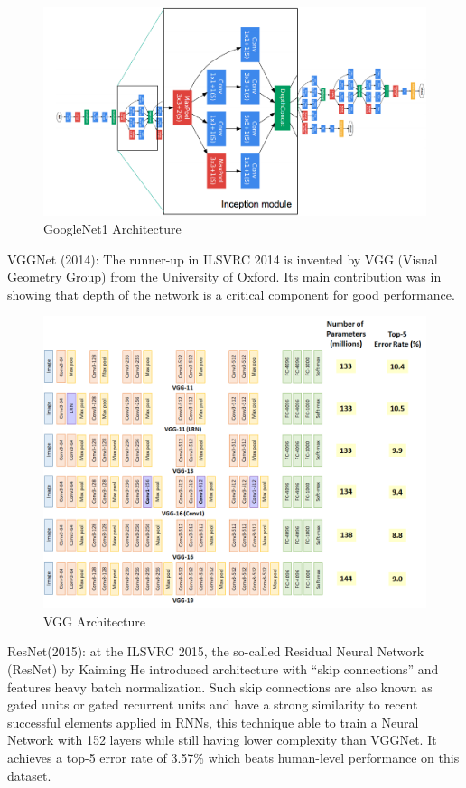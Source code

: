\begin{center}
  \begin{figure}[H]
  \centering
  \includegraphics[width=1\columnwidth]{images/chap2/GoogleNet1.png}
  \caption{GoogleNet1 Architecture}
  \label{chap2:WSP}
  \end{figure}
\end{center}
VGGNet (2014): The runner-up in ILSVRC 2014 is invented by VGG (Visual Geometry Group) from the University of Oxford. Its main contribution was in showing that depth of the network is a critical component for good performance. 
\begin{center}
  \begin{figure}[H]
  \centering
  \includegraphics[width=1\columnwidth]{images/chap2/VGG_arch.png}
  \caption{VGG Architecture}
  \label{chap2:WSP}
  \end{figure}
\end{center}
ResNet(2015): at the ILSVRC 2015, the so-called Residual Neural Network (ResNet) by Kaiming He introduced architecture with “skip connections” and features heavy batch normalization. Such skip connections are also known as gated units or gated recurrent units and have a strong similarity to recent successful elements applied in RNNs, this technique able to train a Neural Network with 152 layers while still having lower complexity than VGGNet. It achieves a top-5 error rate of 3.57\% which beats human-level performance on this dataset.
